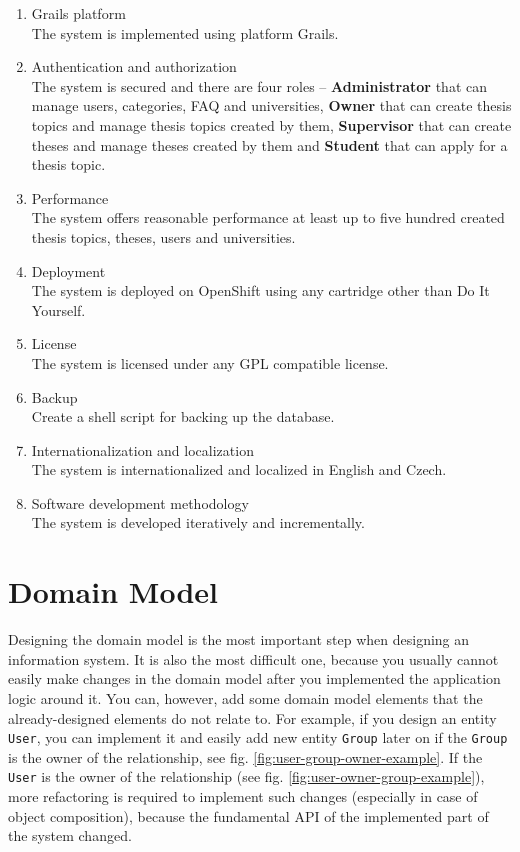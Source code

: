 \begin{enumerate}
    \item Grails platform\\
    The system is implemented using platform Grails.

    \item Authentication and authorization\\
    The system is secured and there are four roles -- \textbf{Administrator} that can manage users, categories, FAQ and universities, \textbf{Owner} that can create thesis topics and manage thesis topics created by them, \textbf{Supervisor} that can create theses and manage theses created by them and \textbf{Student} that can apply for a thesis topic.

    \item Performance\\
    The system offers reasonable performance at least up to five hundred created thesis topics, theses, users and universities.

    \item Deployment\\
    The system is deployed on OpenShift using any cartridge other than Do It Yourself.

    \item License\\
    The system is licensed under any GPL compatible license.

    \item Backup\\
    Create a shell script for backing up the database.

    \item Internationalization and localization\\
    The system is internationalized and localized in English and Czech.

    \item Software development methodology\\
    The system is developed iteratively and incrementally.

\end{enumerate}

\section{Domain Model}

Designing the domain model is the most important step when designing an information system. It is also the most difficult one, because you usually cannot easily make changes in the domain model after you implemented the application logic around it. You can, however, add some domain model elements that the already-designed elements do not relate to. For example, if you design an entity \texttt{User}, you can implement it and easily add new entity \texttt{Group} later on if the \texttt{Group} is the owner of the relationship, see fig. \ref{fig:user-group-owner-example}. If the \texttt{User} is the owner of the relationship (see fig. \ref{fig:user-owner-group-example}), more refactoring is required to implement such changes (especially in case of object composition), because the fundamental API of the implemented part of the system changed.

